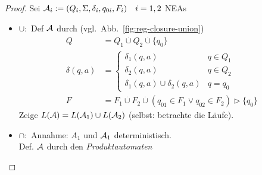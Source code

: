 \begin{proof}
	Sei $\mathcal{A}_i:=(Q_i,\Sigma,\delta_i,q_{0i},F_i)\quad i=1,2$ \acs{NEA}s
	\begin{itemize}
	\item $\cup:$ Def $\mathcal{A}$ durch (vgl.\ Abb.~\ref{fig:reg-closure-union})
		\begin{align*}
			Q &= Q_1\overset.\cup Q_2\overset.\cup\{q_0\}\\
			\delta(q,a) &=
                \begin{cases}
                    \delta_1(q,a) & q\in Q_1\\
                    \delta_2(q,a) & q\in Q_2\\
                    \delta_1(q,a)\cup\delta_2(q,a) & q=q_0
                        \end{cases}\\
                        F &= F_1\overset.\cup F_2\overset.\cup (q_{01}\in F_1\lor q_{02}\in F_2) \rhd \{q_0\}
                \end{align*}
                Zeige $L(\mathcal{A})=L(\mathcal{A}_1)\cup L(\mathcal{A}_2)$ (selbst: betrachte die Läufe).
        \item $\cap:$ 
        Annahme: $A_1$ und $\mathcal{A}_1$ deterministisch.\\
        Def. $\mathcal{A}$ durch den \emph{Produktautomaten}\\
                \begin{figure}[tp]\centering
\end{figure}
\end{itemize}
\end{proof}
